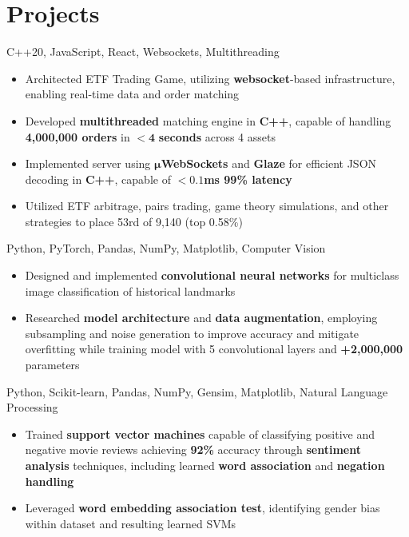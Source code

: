 \documentclass[letterpaper,11pt]{article}
\begin{document}
\section{Projects}
{C++20, JavaScript, React, Websockets, Multithreading}{}
\begin{itemize}
    \item Architected ETF Trading Game, utilizing \textbf{websocket}-based
        infrastructure, enabling real-time data and order matching
    \item Developed \textbf{multithreaded} matching engine in \textbf{C++}, capable of
    handling \textbf{4,000,000 orders} in $\mathbf{< 4}$ \textbf{seconds} across 4 assets
\item Implemented server using $\mathbf{\mu}$\textbf{WebSockets} and
        \textbf{Glaze} for efficient JSON decoding in \textbf{C++}, capable of
        $\mathbf{<0.1}$\textbf{ms 99\% latency}
\end{itemize}
\begin{itemize}
    \item Utilized ETF arbitrage, pairs trading, game theory simulations, and
        other strategies to place 53rd of 9,140 (top 0.58\%)
\end{itemize}
{Python, PyTorch, Pandas, NumPy, Matplotlib, Computer Vision}{}
\begin{itemize}
    \item Designed and implemented \textbf{convolutional neural networks} for multiclass
        image classification of historical landmarks
    \item Researched \textbf{model architecture} and \textbf{data augmentation},
        employing subsampling and noise generation to improve accuracy and mitigate
        overfitting while training model with 5 convolutional layers and
        \textbf{+2,000,000} parameters
\end{itemize}
{Python, Scikit-learn, Pandas, NumPy, Gensim, Matplotlib, Natural Language Processing}{}
\begin{itemize}
    \item Trained \textbf{support vector machines} capable of classifying positive and
        negative movie reviews achieving \textbf{92\%} accuracy through
        \textbf{sentiment analysis} techniques, including learned \textbf{word
        association} and \textbf{negation handling}
    \item Leveraged \textbf{word embedding association test}, identifying
        gender bias within dataset and resulting learned SVMs
\end{itemize}
\end{document}
